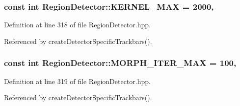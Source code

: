 \hypertarget{classmultiscale_1_1analysis_1_1RegionDetector_aa988e3458f774c489e03e3f8bd0db1ed}{
\subsubsection[{K\-E\-R\-N\-E\-L\-\_\-\-M\-A\-X}]{\setlength{\rightskip}{0pt plus 5cm}const int Region\-Detector\-::\-K\-E\-R\-N\-E\-L\-\_\-\-M\-A\-X = 2000\hspace{0.3cm}{\ttfamily [static]}, {\ttfamily [private]}}}\label{classmultiscale_1_1analysis_1_1RegionDetector_aa988e3458f774c489e03e3f8bd0db1ed}


Definition at line 318 of file Region\-Detector.\-hpp.



Referenced by create\-Detector\-Specific\-Trackbars().

\hypertarget{classmultiscale_1_1analysis_1_1RegionDetector_adeaa40a86b09bad2530bf179cbb4e602}{
\subsubsection[{M\-O\-R\-P\-H\-\_\-\-I\-T\-E\-R\-\_\-\-M\-A\-X}]{\setlength{\rightskip}{0pt plus 5cm}const int Region\-Detector\-::\-M\-O\-R\-P\-H\-\_\-\-I\-T\-E\-R\-\_\-\-M\-A\-X = 100\hspace{0.3cm}{\ttfamily [static]}, {\ttfamily [private]}}}\label{classmultiscale_1_1analysis_1_1RegionDetector_adeaa40a86b09bad2530bf179cbb4e602}


Definition at line 319 of file Region\-Detector.\-hpp.



Referenced by create\-Detector\-Specific\-Trackbars().

